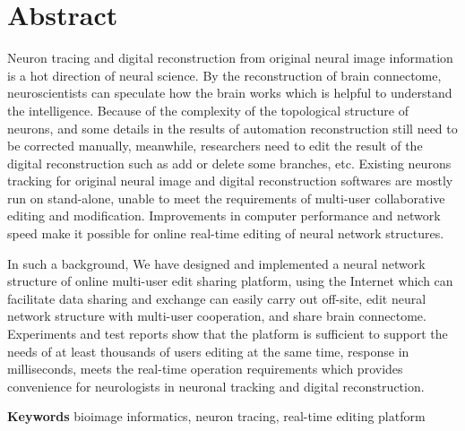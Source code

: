 \chapter{Abstract}

Neuron tracing and digital reconstruction from original neural image information is a hot direction of neural science. By the reconstruction of brain connectome, neuroscientists can speculate how the brain works which is helpful to understand the intelligence. Because of the complexity of the topological structure of neurons, and some details in the results of automation reconstruction still need to be corrected manually, meanwhile, researchers need to edit the result of the digital reconstruction such as add or delete some branches, etc. Existing neurons tracking for original neural image and digital reconstruction softwares are mostly run on stand-alone, unable to meet the requirements of multi-user collaborative editing and modification. Improvements in computer performance and network speed make it possible for online real-time editing of neural network structures. 

In such a background, We have designed and implemented a neural network structure of online multi-user edit sharing platform, using the Internet which can facilitate data sharing and exchange can easily carry out off-site, edit neural network structure with multi-user cooperation, and share brain connectome. Experiments and test reports show that the platform is sufficient to support the needs of at least thousands of users editing at the same time, response in milliseconds, meets the real-time operation requirements which provides convenience for neurologists in neuronal tracking and digital reconstruction.

{
    \vspace{1em}
    \setlength{\parindent}{0em}
    \textbf{Keywords} \; bioimage informatics, \;  neuron tracing, \; real-time editing platform \par
}
